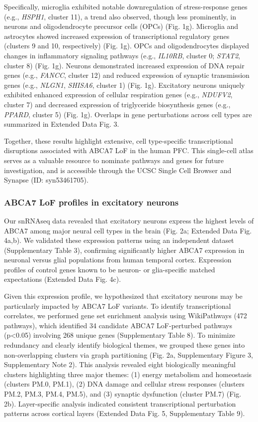 Specifically, microglia exhibited notable downregulation of stress-response genes (e.g., \textit{HSPH1}, cluster 11), a trend also observed, though less prominently, in neurons and oligodendrocyte precursor cells (OPCs) (Fig. 1g). Microglia and astrocytes showed increased expression of transcriptional regulatory genes (clusters 9 and 10, respectively) (Fig. 1g). OPCs and oligodendrocytes displayed changes in inflammatory signaling pathways (e.g., \textit{IL10RB}, cluster 0; \textit{STAT2}, cluster 8) (Fig. 1g). Neurons demonstrated increased expression of DNA repair genes (e.g., \textit{FANCC}, cluster 12) and reduced expression of synaptic transmission genes (e.g., \textit{NLGN1}, \textit{SHISA6}, cluster 1) (Fig. 1g). Excitatory neurons uniquely exhibited enhanced expression of cellular respiration genes (e.g., \textit{NDUFV2}, cluster 7) and decreased expression of triglyceride biosynthesis genes (e.g., \textit{PPARD}, cluster 5) (Fig. 1g). Overlaps in gene perturbations across cell types are summarized in Extended Data Fig. 3.

Together, these results highlight extensive, cell type-specific transcriptional disruptions associated with ABCA7 LoF in the human PFC. This single-cell atlas serves as a valuable resource to nominate pathways and genes for future investigation, and is accessible through the UCSC Single Cell Browser and Synapse (ID: syn53461705).

\subsubsection{ABCA7 LoF profiles in excitatory neurons}
Our snRNAseq data revealed that excitatory neurons express the highest levels of ABCA7 among major neural cell types in the brain (Fig. 2a; Extended Data Fig. 4a,b). We validated these expression patterns using an independent dataset\supercite{Welch2022-ef} (Supplementary Table 3), confirming significantly higher ABCA7 expression in neuronal versus glial populations from human temporal cortex. Expression profiles of control genes known to be neuron- or glia-specific matched expectations (Extended Data Fig. 4c).

Given this expression profile, we hypothesized that excitatory neurons may be particularly impacted by ABCA7 LoF variants. To identify transcriptional correlates, we performed gene set enrichment analysis using WikiPathways (472 pathways), which identified 34 candidate ABCA7 LoF-perturbed pathways (p<0.05) involving 268 unique genes (Supplementary Table 8). To minimize redundancy and clearly identify biological themes, we grouped these genes into non-overlapping clusters via graph partitioning (Fig. 2a, Supplementary Figure 3, Supplementary Note 2). This analysis revealed eight biologically meaningful clusters highlighting three major themes: (1) energy metabolism and homeostasis (clusters PM.0, PM.1), (2) DNA damage and cellular stress responses (clusters PM.2, PM.3, PM.4, PM.5), and (3) synaptic dysfunction (cluster PM.7) (Fig. 2b). Layer-specific analysis indicated consistent transcriptional perturbation patterns across cortical layers (Extended Data Fig. 5, Supplementary Table 9).

